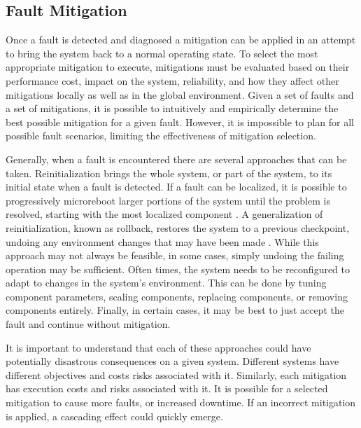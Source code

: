 \subsection{Fault Mitigation}
\label{sub:fault_mitigation}
Once a fault is detected and diagnosed a mitigation can be applied in an
attempt to bring the system back to a normal operating state. To select the
most appropriate mitigation to execute, mitigations must be evaluated based on
their performance cost, impact on the system, reliability, and how they affect
other mitigations locally as well as in the global environment. Given a set of
faults and a set of mitigations, it is possible to intuitively and empirically
determine the best possible mitigation for a given fault. However, it is
impossible to plan for all possible fault scenarios, limiting the effectiveness
of mitigation selection.

Generally, when a fault is encountered there are several approaches that can be
taken. Reinitialization brings the whole system, or part of the system, to its
initial state when a fault is detected.  If a fault can be localized, it is
possible to progressively microreboot larger portions of the system until the
problem is resolved, starting with the most localized component
\cite{1251257}. A generalization of reinitialization, known as rollback,
restores the system to a previous checkpoint, undoing any environment changes
that may have been made \cite{1095833}. While this approach may not always be
feasible, in some cases, simply undoing the failing operation may be
sufficient. Often times, the system needs to be reconfigured to adapt to
changes in the system's environment. This can be done by tuning component
parameters, scaling components, replacing components, or removing components
entirely. Finally, in certain cases, it may be best to just accept the fault
and continue without mitigation.

It is important to understand that each of these approaches could have
potentially disastrous consequences on a given system. Different systems have
different objectives and costs risks associated with it. Similarly, each
mitigation has execution costs and risks associated with it. It is possible for
a selected mitigation to cause more faults, or increased downtime. If an
incorrect mitigation is applied, a cascading effect could quickly emerge.


